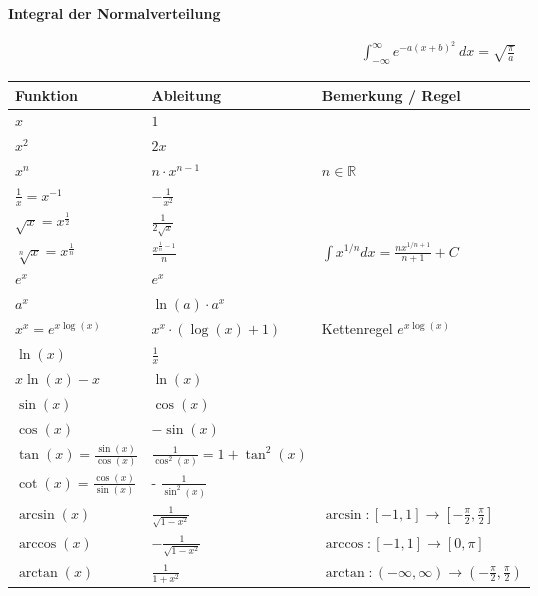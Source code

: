 \documentclass[25pt]{sciposter}
\newcommand{\R}{\mathbb{R}}
\newenvironment{thm}[1]{\begin{mdframed}[backgroundcolor=pink!20,innertopmargin=15pt, innerbottommargin=15pt, nobreak=true]
		\textbf{#1 }
	}
	{ 
	\end{mdframed}
}
\begin{document}
\begin{multicols}{3}
		
		\begin{thm}{Integral der Normalverteilung}
			\begin{align*}
				\int_{-\infty}^{\infty} e^{-a(x+b)^2} \ dx = \sqrt{\frac{\pi}{a}}
			\end{align*}
		\end{thm}
		
		
		
		
		\vfill\null
		\columnbreak
		
		
		{\renewcommand{\arraystretch}{1.5}
			\begin{table}[]
				\begin{tabular}{@{} p{} p{} p{} @{}}
					\toprule
					Funktion & Ableitung & Bemerkung / Regel\\ \midrule
					$x$ & $1$ &   \\
					$x^2$& $2x$ &   \\
					$x^n$& $n\cdot x^{n-1}$ & $n \in \R$  \\
					$\frac{1}{x} = x^{-1}$ & $- \frac{1}{x^2}$ & \\
					$\sqrt{x} = x^{\frac{1}{2}}$ & $\frac{1}{2\sqrt{x}}$ & \\ 
					$\sqrt[n]{x} = x^{\frac{1}{n}}$ & $\frac{x^{\frac{1}{n} -1 }}{n}$ &  $\int x^{1/n} dx = \frac{n x^{1/n + 1}}{n+1} + C$\\ 
					$e^x$ & $e^x$ & \\
					$a^x$ & $\ln(a) \cdot a^x$& \\
					$x^x = e^{x\log(x)}$ & $x^x \cdot (\log(x) + 1)$ & Kettenregel $e^{x\log(x)}$\\
					$\ln(x)$ & $\frac{1}{x}$ & \\
					$x\ln(x) - x$ & $\ln(x)$ &  \\ \midrule
					$\sin(x)$ & $\cos(x)$ & \\
					$\cos(x)$ & $- \sin(x)$ & \\ 
					$\tan(x) = \frac{\sin(x)}{\cos(x)}$ & $\frac{1}{\cos^2(x)} = 1 + \tan^2(x)$ &\\
					$\cot(x) = \frac{\cos(x)}{\sin(x)}$ & - $\frac{1}{\sin^2(x)}$ & \\ 
					$\arcsin(x)$ & $\frac{1}{\sqrt{1 - x^2}}$ & $ \arcsin : [-1,1] \to [-\frac{\pi}{2},\frac{\pi}{2}]$\\
					$\arccos(x)$ & $ - \frac{1}{\sqrt{1-x^2}}$ & $\arccos : [-1,1] \to [0, \pi]$\\
					$\arctan(x)$ & $\frac{1}{1+x^2}$ & $\arctan:(-\infty, \infty) \to (- \frac{\pi}{2},\frac{\pi}{2})$\\

\end{tabular}
\end{table}}
\end{multicols}
\end{document}
